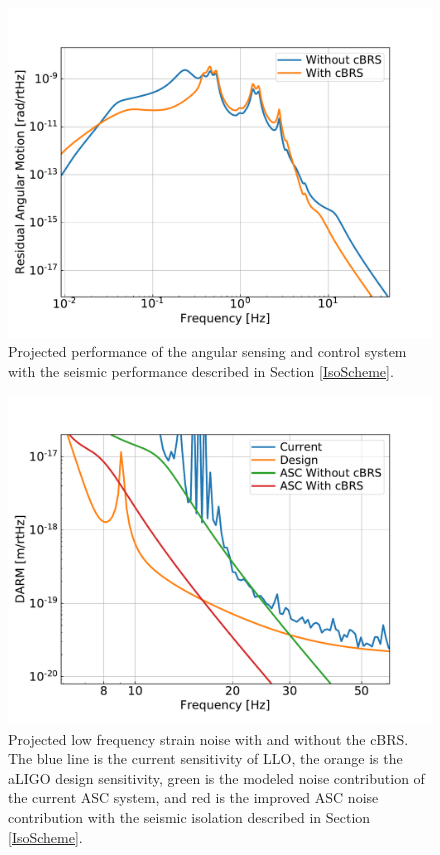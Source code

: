 \documentclass [12pt, proquest]{uwthesis}[2019]
\begin{document}
\begin{figure}
\begin{center}
\includegraphics[width=\textwidth]{cBRS_ASC_LowF.pdf}
\caption{Projected performance of the angular sensing and control system with the seismic performance described in Section \ref{IsoScheme}.}
\label{ascComp}
\end{center}
\end{figure}

\begin{figure}
\begin{center}
\includegraphics[width=\textwidth]{cBRS_ASC.pdf}
\caption{Projected low frequency strain noise with and without the cBRS. The blue line is the current sensitivity of LLO, the orange is the aLIGO design sensitivity, green is the modeled noise contribution of the current ASC system, and red is the improved ASC noise contribution with the seismic isolation described in Section \ref{IsoScheme}. }
\label{ascStrain}
\end{center}
\end{figure}
\end{document}
